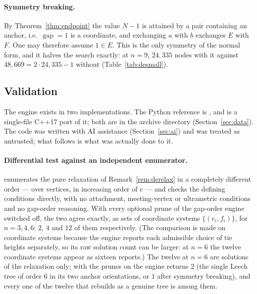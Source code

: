 \paragraph{Symmetry breaking.}
By Theorem~\ref{thm:endpoint} the value $N-1$ is attained by a pair containing
an anchor, i.e.\ $\operatorname{gap}=1$ is a coordinate, and exchanging $a$ with
$b$ exchanges $E$ with $F$.  One may therefore assume $1\in E$.  This is the
only symmetry of the normal form, and it halves the search exactly: at $n=9$,
$24{,}335$ nodes with it against $48{,}669=2\cdot24{,}335-1$ without
(Table~\ref{tab:desmall}).

\subsection{Validation}\label{sec:de:valid}

The engine exists in two implementations.  The Python reference is
, and
 is a single-file C++17 port of it; both
are in the archive directory 
(Section~\ref{sec:data}).  The code was written with AI assistance
(Section~\ref{sec:ai}) and was treated as untrusted; what follows is what was
actually done to it.

\paragraph{Differential test against an independent enumerator.}
 enumerates the pure relaxation of
Remark~\ref{rem:derelax} in a completely different order --- over vertices, in
increasing order of $e$ --- and checks the defining conditions directly, with no
attachment, meeting-vertex or ultrametric conditions and no gap-order
reasoning.  With every optional prune of the gap-order engine switched off, the
two agree exactly, as sets of coordinate systems $\{(e_i,f_i)\}$, for
$n=3,4,6$: $2$, $4$ and $12$ of them respectively.  (The comparison is made on
coordinate systems because the engine reports each admissible choice of tie
heights separately, so its raw solution count can be larger: at $n=6$ the
twelve coordinate systems appear as sixteen reports.)  The twelve at $n=6$ are
solutions of the relaxation only; with the prunes on the engine returns $2$
(the single Leech tree of order $6$ in its two anchor orientations, or $1$ after
symmetry breaking), and every one of the twelve that rebuilds as a genuine tree
is among them.

